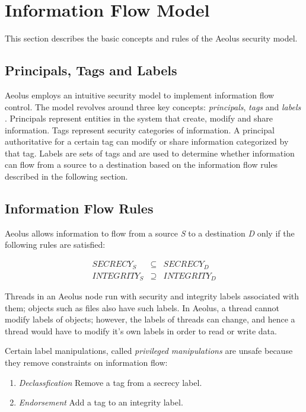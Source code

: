 \section{Information Flow Model}

This section describes the basic concepts and rules of the Aeolus security model.

\subsection{Principals, Tags and Labels}\label{principals}

Aeolus employs an intuitive security model to implement information flow control. The model revolves around three key concepts: \emph{principals}, \emph{tags} and \emph{labels} \cite{aeolus}. Principals represent entities in the system that create, modify and share information. Tags represent security categories of information. A principal authoritative for a certain tag can modify or share information categorized by that tag. Labels are sets of tags and are used to determine whether information can flow from a source to a destination based on the information flow rules described in the following section.

\subsection{Information Flow Rules}\label{difc:rules}

Aeolus allows information to flow from a source \emph{S} to a destination \emph{D} only if the following rules are satisfied:

\begin{eqnarray*}
  SECRECY_{S} &\subseteq& SECRECY_{D} \\
  INTEGRITY_{S} &\supseteq& INTEGRITY_{D}
\end{eqnarray*}

Threads in an Aeolus node run with security and integrity labels associated with them; objects such as files also have such labels. In Aeolus, a thread cannot modify labels of objects; however, the labels of threads can change, and hence a thread would have to modify it's own labels in order to read or write data. 

Certain label manipulations, called \emph{privileged manipulations} are unsafe because they remove constraints on information flow:

\begin{enumerate}
  \item \emph{Declassfication} Remove a tag from a secrecy label.
  \item \emph{Endorsement} Add a tag to an integrity label.
\end{enumerate}

